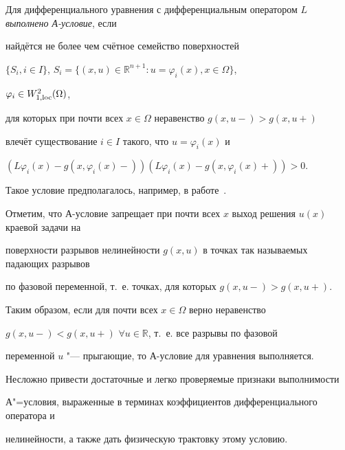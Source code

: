 Для дифференциального уравнения с дифференциальным  оператором $L$ {\it выполнено А-условие}, если

найдётся не более чем счётное семейство поверхностей

$\{S_i, i\in I\}$, $S_i=\{(x,u)\in \mathbb R^{n+1} : u=\varphi_i(x), x\in\Omega\}$,

$\varphi_i\in{ W}_{1, \rm loc}^2(\Omega)$,

для которых при почти всех $x\in\Omega$ неравенство $g(x,u-)>g(x,u+)$

влечёт существование $i\in I$ такого, что $u=\varphi_i(x)$ и 

$(L\varphi_i(x)-g(x,\varphi_i(x)-))(L\varphi_i(x)-g(x,\varphi_i(x)+))>0$.



\smallskip



Такое условие предполагалось, например, в работе~\cite{pot7}. 

Отметим, что А-условие запрещает при почти всех $x$ выход решения $u(x)$ краевой задачи на

поверхности разрывов нелинейности $g(x,u)$ в точках так называемых падающих разрывов 

по фазовой переменной, т.~е. точках, для которых $g(x,u-)>g(x,u+)$.

Таким образом, если для почти всех $x\in\Omega$ верно неравенство

$g(x,u-)<g(x,u+)$ $\forall u\in \mathbb R$, т.~е. все разрывы по фазовой 

переменной $u$ "--- прыгающие, то А-условие для уравнения выполняется.

Несложно привести достаточные и легко проверяемые признаки выполнимости

А"=условия, выраженные в терминах коэффициентов дифференциального оператора и

нелинейности, а также дать физическую трактовку этому условию.



